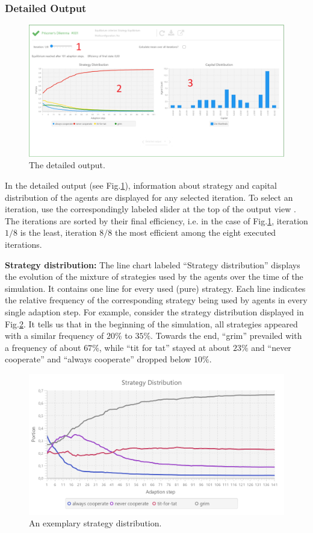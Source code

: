 \documentclass[parskip=full,11pt]{scrartcl}
\newcommand*\circled[1]{\tikz[baseline=(char.base)]{
            \node[shape=circle,draw,inner sep=2pt] (char) {#1};}}
\begin{document}
\subsubsection{Detailed Output}
\begin{figure}
	\centering
	\includegraphics[width=\linewidth]{img_manual/detailed_output.png}
	\caption{The detailed output.}
	\label{fig:detailed_output}
\end{figure}
In the detailed output (see Fig.\ref{fig:detailed_output}), information about strategy and capital distribution of the agents are displayed for any selected iteration. To select an iteration, use the correspondingly labeled slider at the top of the output view \circled{1}. The iterations are sorted by their final efficiency, i.e. in the case of Fig.\ref{fig:detailed_output}, iteration \(1/8\) is the least, iteration \(8/8\) the most efficient among the eight executed iterations.

\textbf{Strategy distribution:} The line chart labeled \enquote{Strategy distribution} \circled{2} displays the evolution of the mixture of strategies used by the agents over the time of the simulation. It contains one line for every used (pure) strategy. Each line indicates the relative frequency of the corresponding strategy being used by agents in every single adaption step. For example, consider the strategy distribution displayed in Fig.\ref{fig:strategy_distribution}. It tells us that in the beginning of the simulation, all strategies appeared with a similar frequency of \(20\%\) to \(35\%\). Towards the end, \enquote{grim} prevailed with a frequency of about \(67\%\), while \enquote{tit for tat} stayed at about \(23\%\) and \enquote{never cooperate} and \enquote{always cooperate} dropped below \(10\%\).

\begin{figure}[h]
	\centering
	\includegraphics[width=0.8\linewidth]{img_manual/strategy_distribution.png}
	\caption{An exemplary strategy distribution.}
	\label{fig:strategy_distribution}
\end{figure}
\end{document}
